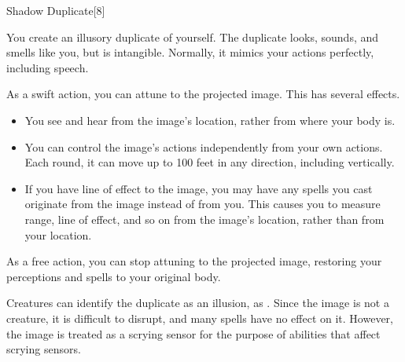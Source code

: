 \begin{spellsection}{Shadow Duplicate}[8]
    \begin{spellheader}
    \end{spellheader}
    \begin{spellcontent}
        \begin{spelltargetinginfo}
            \spellrng{\rngmed}
        \end{spelltargetinginfo}
        \begin{spelleffects}
            \spelleffect You create an illusory duplicate of yourself. The duplicate looks, sounds, and smells like you, but is intangible. Normally, it mimics your actions perfectly, including speech.
            \par As a swift action, you can attune to the projected image. This has several effects.
            \begin{itemize}
                \item You see and hear from the image's location, rather from where your body is.
                \item You can control the image's actions independently from your own actions. Each round, it can move up to 100 feet in any direction, including vertically.
                \item If you have line of effect to the image, you may have any spells you cast originate from the image instead of from you.
                    This causes you to measure range, line of effect, and so on from the image's location, rather than from your location.
            \end{itemize}

            As a free action, you can stop attuning to the projected image, restoring your perceptions and spells to your original body.

            \spelldur \durlong \dismissable
        \end{spelleffects}
    \end{spellcontent}
    \begin{spellfooter}
        \spellnotes Creatures can identify the duplicate as an illusion, as .
        Since the image is not a creature, it is difficult to disrupt, and many spells have no effect on it.
        However, the image is treated as a scrying sensor for the purpose of abilities that affect scrying sensors.
        \miscastexplode
    \end{spellfooter}
\end{spellsection}

